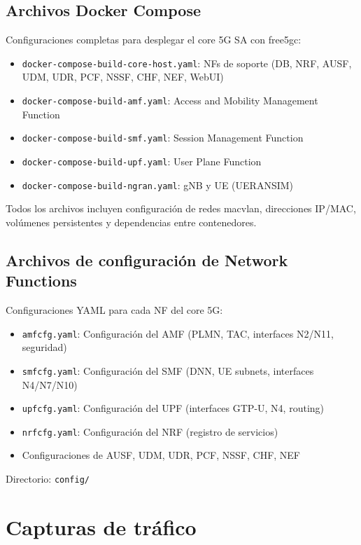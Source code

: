 \subsection{Archivos Docker Compose}
Configuraciones completas para desplegar el core 5G SA con free5gc:
\begin{itemize}
    \item \texttt{docker-compose-build-core-host.yaml}: NFs de soporte (DB, NRF, AUSF, UDM, UDR, PCF, NSSF, CHF, NEF, WebUI)
    \item \texttt{docker-compose-build-amf.yaml}: Access and Mobility Management Function
    \item \texttt{docker-compose-build-smf.yaml}: Session Management Function
    \item \texttt{docker-compose-build-upf.yaml}: User Plane Function
    \item \texttt{docker-compose-build-ngran.yaml}: gNB y UE (UERANSIM)
\end{itemize}

Todos los archivos incluyen configuración de redes macvlan, direcciones IP/MAC, volúmenes persistentes y dependencias entre contenedores.

\subsection{Archivos de configuración de Network Functions}
Configuraciones YAML para cada NF del core 5G:
\begin{itemize}
    \item \texttt{amfcfg.yaml}: Configuración del AMF (PLMN, TAC, interfaces N2/N11, seguridad)
    \item \texttt{smfcfg.yaml}: Configuración del SMF (DNN, UE subnets, interfaces N4/N7/N10)
    \item \texttt{upfcfg.yaml}: Configuración del UPF (interfaces GTP-U, N4, routing)
    \item \texttt{nrfcfg.yaml}: Configuración del NRF (registro de servicios)
    \item Configuraciones de AUSF, UDM, UDR, PCF, NSSF, CHF, NEF
\end{itemize}

Directorio: \texttt{config/}

\section{Capturas de tráfico}

